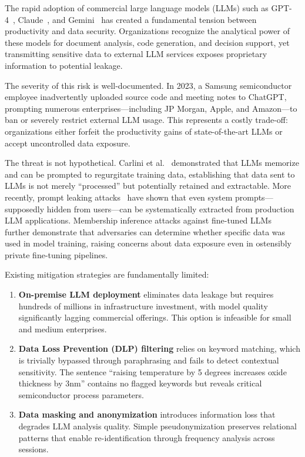 \documentclass[11pt]{article}
\begin{document}
The rapid adoption of commercial large language models (LLMs) such as GPT-4~\cite{openai2023gpt4}, Claude~\cite{anthropic2024claude}, and Gemini~\cite{google2024gemini} has created a fundamental tension between productivity and data security. Organizations recognize the analytical power of these models for document analysis, code generation, and decision support, yet transmitting sensitive data to external LLM services exposes proprietary information to potential leakage.

The severity of this risk is well-documented. In 2023, a Samsung semiconductor employee inadvertently uploaded source code and meeting notes to ChatGPT, prompting numerous enterprises---including JP Morgan, Apple, and Amazon---to ban or severely restrict external LLM usage. This represents a costly trade-off: organizations either forfeit the productivity gains of state-of-the-art LLMs or accept uncontrolled data exposure.

The threat is not hypothetical. Carlini et al.~\cite{carlini2021extracting} demonstrated that LLMs memorize and can be prompted to regurgitate training data, establishing that data sent to LLMs is not merely ``processed'' but potentially retained and extractable. More recently, prompt leaking attacks~\cite{hui2024pleak} have shown that even system prompts---supposedly hidden from users---can be systematically extracted from production LLM applications. Membership inference attacks against fine-tuned LLMs~\cite{duan2024membership,fu2024membership} further demonstrate that adversaries can determine whether specific data was used in model training, raising concerns about data exposure even in ostensibly private fine-tuning pipelines.

Existing mitigation strategies are fundamentally limited:

\begin{enumerate}
\item \textbf{On-premise LLM deployment} eliminates data leakage but requires hundreds of millions in infrastructure investment, with model quality significantly lagging commercial offerings. This option is infeasible for small and medium enterprises.

\item \textbf{Data Loss Prevention (DLP) filtering} relies on keyword matching, which is trivially bypassed through paraphrasing and fails to detect contextual sensitivity. The sentence ``raising temperature by 5 degrees increases oxide thickness by 3nm'' contains no flagged keywords but reveals critical semiconductor process parameters.

\item \textbf{Data masking and anonymization} introduces information loss that degrades LLM analysis quality. Simple pseudonymization preserves relational patterns that enable re-identification through frequency analysis across sessions.
\end{enumerate}
\end{document}
